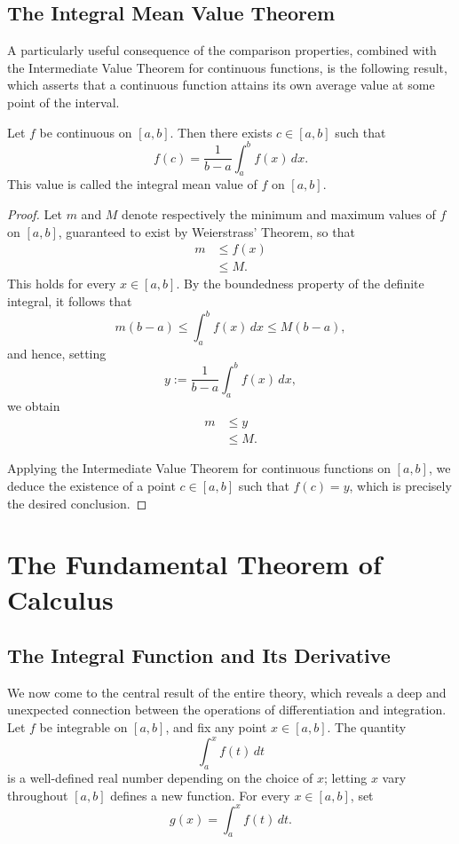 \subsection{The Integral Mean Value Theorem}

A particularly useful consequence of the comparison properties, combined with the Intermediate Value Theorem for continuous functions, is the following result, which asserts that a continuous function attains its own average value at some point of the interval.

\begin{theorem}
Let $f$ be continuous on $[a,b]$. Then there exists $c \in [a,b]$ such that
\[
f(c) = \frac{1}{b-a} \int_a^b f(x) \, dx.
\]
This value is called the integral mean value of $f$ on $[a,b]$.
\end{theorem}

\begin{proof}
Let $m$ and $M$ denote respectively the minimum and maximum values of $f$ on $[a,b]$, guaranteed to exist by Weierstrass' Theorem, so that
\[
\begin{aligned}
m &\leq f(x) \\
&\leq M.
\end{aligned}
\]
This holds for every $x \in [a,b]$. By the boundedness property of the definite integral, it follows that
\[
m(b-a) \leq \int_a^b f(x) \, dx \leq M(b-a),
\]
and hence, setting
\[
y := \frac{1}{b-a} \int_a^b f(x) \, dx,
\]
we obtain
\[
\begin{aligned}
m &\leq y \\
&\leq M.
\end{aligned}
\]

Applying the Intermediate Value Theorem for continuous functions on $[a,b]$, we deduce the existence of a point $c \in [a,b]$ such that $f(c) = y$, which is precisely the desired conclusion.
\end{proof}

\section{The Fundamental Theorem of Calculus}

\subsection{The Integral Function and Its Derivative}

We now come to the central result of the entire theory, which reveals a deep and unexpected connection between the operations of differentiation and integration. Let $f$ be integrable on $[a,b]$, and fix any point $x \in [a,b]$. The quantity \[
\int_a^x f(t) \, dt
\] is a well-defined real number depending on the choice of $x$; letting $x$ vary throughout $[a,b]$ defines a new function. For every $x \in [a,b]$, set
\[
g(x) = \int_a^x f(t) \, dt.
\]

